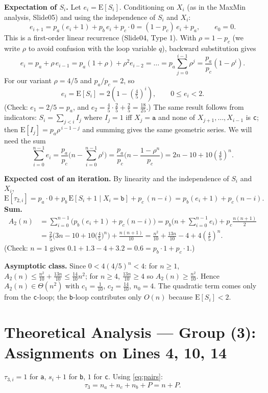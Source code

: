\documentclass[11pt]{article}
\theoremstyle{remark}
\newcommand{\E}{\mathrm{E}}
\newcommand{\ta}{\texttt{a}}
\newcommand{\tb}{\texttt{b}}
\newcommand{\tc}{\texttt{c}}
\begin{document}
\textbf{Expectation of $S_i$.} Let $e_i=\E[S_i]$. Conditioning on $X_i$ (as in the MaxMin analysis, Slide05) and using
the independence of $S_i$ and $X_i$:
\[
e_{i+1}=p_a(e_i+1)+p_b\,e_i+p_c\cdot 0=(1-p_c)\,e_i+p_a,\qquad e_0=0 .
\]
This is a first-order linear recurrence (Slide04, Type 1). With $\rho=1-p_c$ (we write $\rho$ to avoid confusion with the loop variable $q$), backward substitution gives
\[
e_i = p_a + \rho\,e_{i-1} = p_a(1+\rho) + \rho^2 e_{i-2}=\dots=p_a\sum_{j=0}^{i-1}\rho^{j}=\frac{p_a}{p_c}\left(1-\rho^{i}\right).
\]
For our variant $\rho=4/5$ and $p_a/p_c=2$, so
\[
e_i=\E[S_i] = 2\left(1-\left(\tfrac45\right)^{i}\right),\qquad 0\le e_i<2 .
\]
(Check: $e_1=2/5=p_a$, and $e_2 = \frac45\cdot\frac25+\frac25=\frac{18}{25}$.) The same result follows from
indicators: $S_i=\sum_{j<i}I_j$ where $I_j=1$ iff $X_j=\ta$ and none of $X_{j+1},\dots,X_{i-1}$ is \tc; then
$\E[I_j]=p_a \rho^{\,i-1-j}$ and summing gives the same geometric series. We will need the sum
\[
\sum_{i=0}^{n-1}e_i=\frac{p_a}{p_c}\Big(n-\sum_{i=0}^{n-1}\rho^{i}\Big)=\frac{p_a}{p_c}\Big(n-\frac{1-\rho^{n}}{p_c}\Big)
=2n-10+10\left(\tfrac45\right)^{n}.
\]

\textbf{Expected cost of an iteration.} By linearity and the independence of $S_i$ and $X_i$,
\[
\E[\tau_{2,i}] = p_a\cdot 0 + p_b\,\E[S_i+1\mid X_i=\tb] + p_c\,(n-i) = p_b(e_i+1)+p_c(n-i).
\]
\textbf{Sum.}
\begin{align*}
A_2(n)&=\sum_{i=0}^{n-1}\big(p_b(e_i+1)+p_c(n-i)\big)
= p_b\Big(n+\sum_{i=0}^{n-1}e_i\Big)+p_c\frac{n(n+1)}{2}\\
&=\frac25\Big(3n-10+10\big(\tfrac45\big)^n\Big)+\frac{n(n+1)}{10}
=\frac{n^2}{10}+\frac{13n}{10}-4+4\left(\frac45\right)^{n}.
\end{align*}
(Check: $n=1$ gives $0.1+1.3-4+3.2=0.6=p_b\cdot1+p_c\cdot1$.)

\textbf{Asymptotic class.} Since $0<4(4/5)^n<4$: for $n\ge1$, $A_2(n)\le \frac{n^2}{10}+\frac{13n}{10}\le \frac{14}{10}n^2$;
for $n\ge 4$, $\frac{13n}{10}\ge 4$ so $A_2(n)\ge \frac{n^2}{10}$. Hence $A_2(n)\in\Theta(n^2)$ with $c_1=\frac1{10}$,
$c_2=\frac{14}{10}$, $n_0=4$. The quadratic term comes only from the \tc-loop; the \tb-loop contributes only
$O(n)$ because $\E[S_i]<2$.

\section{Theoretical Analysis --- Group (3): Assignments on Lines 4, 10, 14}
$\tau_{3,i}=1$ for \ta, $s_i+1$ for \tb, $1$ for \tc. Using \eqref{eq:pairs}:
\[
\tau_3=n_a+n_c+n_b+P = n+P .
\]
\end{document}

